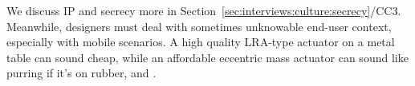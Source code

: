 \noindent
We discuss %
IP and secrecy more in Section~\ref{sec:interviews:culture:secrecy}/CC3.
Meanwhile, designers must deal with sometimes unknowable end-user context, especially with mobile scenarios.
A high quality LRA-type actuator on a metal table can sound cheap, while an affordable eccentric mass actuator can sound like purring if it's on rubber, and 
.



\label{sec:tailoringandcustomization}
